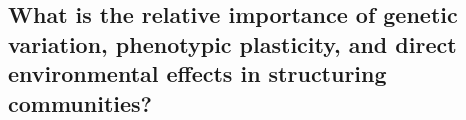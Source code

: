 \documentclass[11pt]{article}
\begin{document}















\subsection*{What is the relative importance of genetic variation, phenotypic plasticity, and direct environmental effects in structuring communities?}
\end{document}
